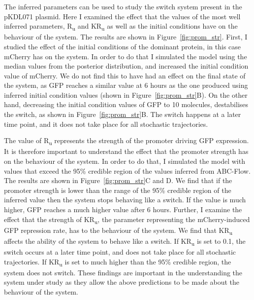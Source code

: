 The inferred parameters can be used to study the switch system present in the pKDL071 plasmid. Here I examined the effect that the values of the most well inferred parameters, R\textsubscript{u} and KR\textsubscript{u} as well as the initial conditions have on the behaviour of the system. The results are shown in Figure~\ref{fig:prom_str}. First, I studied the effect of the initial conditions of the dominant protein, in this case mCherry has on the system. In order to do that I simulated the model using the median values from the posterior distribution, and increased the initial condition value of mCherry. We do not find this to have had an effect on the final state of the system, as GFP reaches a similar value at 6 hours as the one produced using inferred initial condition values (shown in Figure~\ref{fig:prom_str}B). On the other hand, decreasing the initial condition values of GFP to 10 molecules, destabilises the switch, as shown in Figure~\ref{fig:prom_str}B. The switch happens at a later time point, and it does not take place for all stochastic trajectories.   

The value of R\textsubscript{u} represents the strength of the promoter driving GFP expression. It is therefore important to understand the effect that the promoter strength has on the behaviour of the system. In order to do that, I simulated the model with values that exceed the 95\% credible region of the values inferred from ABC-Flow. The results are shown in Figure~\ref{fig:prom_str}C and D. We find that if the promoter strength is lower than the range of the 95\% credible region of the inferred value then the system stops behaving like a switch. If the value is much higher, GFP reaches a much higher value after 6 hours. Further, I examine the effect that the strength of KR\textsubscript{u}, the parameter representing the mCherry-induced GFP repression rate, has to the behaviour of the system. We find that KR\textsubscript{u} affects the ability of the system to behave like a switch. If KR\textsubscript{u} is set to 0.1, the switch occurs at a later time point, and does not take place for all stochastic trajectories. If KR\textsubscript{u} is set to much higher than the 95\% credible region, the system does not switch. These findings are important in the understanding the system under study as they allow the above predictions to be made about the behaviour of the system.  


